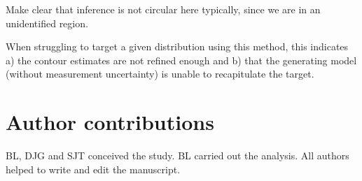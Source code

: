 \documentclass[10pt,letterpaper]{article}
\begin{document}
Make clear that inference is not circular here typically, since we are in an unidentified region.

When struggling to target a given distribution using this method, this indicates a) the contour estimates are not refined enough and b) that the generating model (without measurement uncertainty) is unable to recapitulate the target.


\section{Author contributions}
BL, DJG and SJT conceived the study. BL carried out the analysis. All authors helped to write and edit the manuscript.


\nolinenumbers



\end{document}
